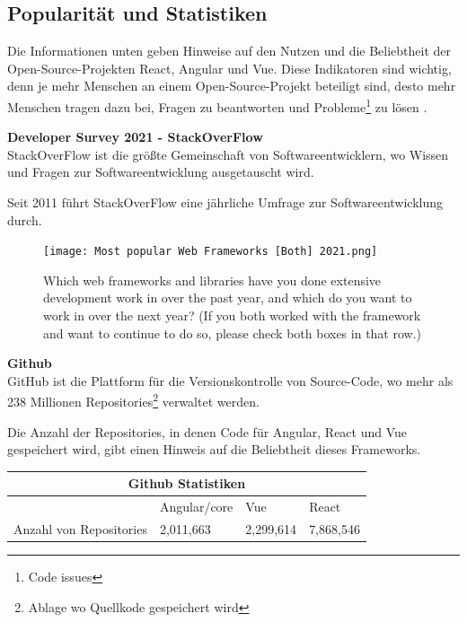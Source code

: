 \newpage    
\subsection{Popularität und Statistiken}
Die Informationen unten geben Hinweise auf den Nutzen und die Beliebtheit der Open-Source-Projekten React, Angular und Vue. Diese Indikatoren sind wichtig, denn je mehr Menschen an einem Open-Source-Projekt beteiligt sind, desto mehr Menschen tragen dazu bei, Fragen zu beantworten und Probleme\footnote{Code issues} zu lösen {\cite{LIN1}}.
\begin{flushleft}
  \textbf{Developer Survey 2021 - StackOverFlow}\\
  StackOverFlow ist die größte Gemeinschaft von Softwareentwicklern, wo Wissen und Fragen zur Softwareentwicklung ausgetauscht wird.

  Seit 2011 führt StackOverFlow eine jährliche Umfrage zur Softwareentwicklung durch.

\begin{figure}[h]
  \centering
  \texttt{[image: Most popular Web Frameworks [Both] 2021.png]}
  \caption{ Which web frameworks and libraries have you done extensive development work in over the past year, and which do you want to work in over the next year? (If you both worked with the framework and want to continue to do so, please check both boxes in that row.) {\cite{SO01}}}

\end{figure}
\end{flushleft}

\newpage

\begin{flushleft}
  \textbf{Github}\\
  GitHub ist die Plattform für die Versionskontrolle von Source-Code, wo mehr als 238 Millionen Repositories\footnote{Ablage wo Quellkode gespeichert wird} verwaltet werden{\cite{GH07}}.  
\end{flushleft}

Die Anzahl der Repositories, in denen Code für Angular, React und Vue gespeichert wird, gibt einen Hinweis auf die Beliebtheit dieses Frameworks.
\\
\begin{table}[h!]
  \centering
  \begin{tabular}{ |p{3cm}||p{3cm}|p{3.6cm}|p{3.6cm}|  }
    \hline
    \multicolumn{4}{|c|}{Github Statistiken}                        \\
    \hline
                            & Angular/core & Vue       & React     \\
    \hline
    Anzahl von     Repositories & 2,011,663     & 2,299,614 & 7,868,546
    \\
    \hline
  \end{tabular}
\end{table}

